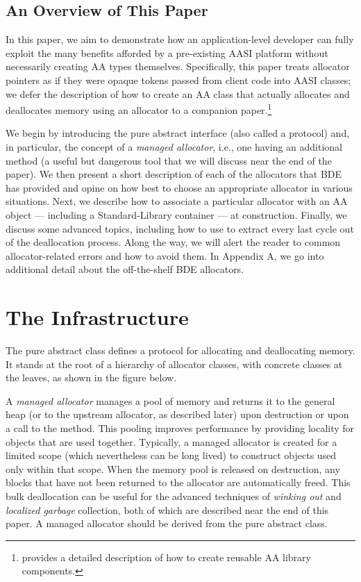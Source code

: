 \subsection{An Overview of This Paper}
In this paper, we aim to demonstrate how an application-level developer can
fully exploit the many benefits afforded by a pre-existing AASI platform without
necessarily creating AA types themselves. Specifically, this paper treats
allocator pointers as if they were opaque tokens passed from client code into
AASI classes; we defer the description of how to create an AA class that
actually allocates and deallocates memory using an allocator to a companion
paper.\footnote{\cite{halpern20b} provides a detailed description of how to create reusable AA library components.}

We begin by introducing the pure abstract  interface (also
called a protocol) and, in particular, the concept of a \emph{managed allocator}, i.e.,
one having an additional  method (a useful but dangerous tool that we
will discuss near the end of the paper). We then present a short description of
each of the allocators that BDE has provided and opine on how best to choose
an appropriate allocator in various situations. Next, we describe how to
associate a particular allocator with an AA object — including a Standard-Library
container — at construction. Finally, we discuss some advanced topics,
including how to use  to extract every last cycle out of the deallocation
process. Along the way, we will alert the reader to common allocator-related
errors and how to avoid them. In Appendix A, we go into additional detail about
the off-the-shelf BDE allocators.

\section{The  Infrastructure}

The pure abstract class  defines a protocol for allocating and
deallocating memory. It stands at the root of a hierarchy of allocator classes,
with concrete classes at the leaves, as shown in the figure below.


A \emph{managed allocator} manages a pool of memory and returns it to the general
heap (or to the upstream allocator, as described later) upon destruction or
upon a call to the  method. This pooling improves performance by
providing locality for objects that are used together. Typically, a managed
allocator is created for a limited scope (which nevertheless can be long lived) to
construct objects used only within that scope. When the memory pool is
released on destruction, any blocks that have not been returned to the
allocator are automatically freed. This bulk deallocation can be useful for the 
advanced techniques of \emph{winking out} and \emph{localized garbage} collection, both of
which are described near the end of this paper. A managed allocator should be
derived from the  pure abstract class.


